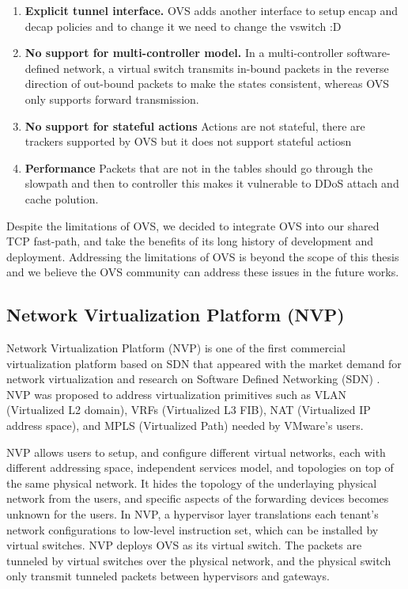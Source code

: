 \begin{enumerate}
    \item \textbf{Explicit tunnel interface.} OVS adds another interface to setup encap and 
    decap policies and to change it we need to change the vswitch :D %

    \item \textbf{No support for multi-controller model.} In a multi-controller 
    software-defined network, a virtual switch transmits in-bound packets in the reverse 
    direction of out-bound packets to make the states consistent, whereas OVS only supports forward transmission. 

    \item \textbf{No support for stateful actions} Actions are not stateful, there are 
    trackers supported by OVS but it does not support stateful actiosn %

    \item \textbf{Performance} Packets that are not in the tables should go through the 
    slowpath and then to controller this makes it vulnerable to DDoS attach and cache 
    polution.  %

\end{enumerate}

Despite the limitations of OVS, we decided to integrate OVS into our shared TCP fast-path,
and take the benefits of its long history of development and deployment. Addressing 
the limitations of OVS is beyond the scope of this thesis and we believe the OVS community can
address these issues in the future works. 

\subsection{Network Virtualization Platform (NVP)}
\label{nvp}
Network Virtualization Platform (NVP) is one of the first commercial virtualization 
platform based on SDN that appeared with the market demand for network virtualization
and research on Software Defined Networking (SDN) \cite{koponen2014network}. NVP was proposed 
to address virtualization primitives such as VLAN (Virtualized L2 domain), 
VRFs (Virtualized L3 FIB), NAT 
(Virtualized IP address space), and MPLS (Virtualized Path) needed by VMware's users.

NVP allows users to setup, and configure different virtual networks, each with
different addressing space, independent services model, and topologies
on top of the same physical network. It hides the topology of  the underlaying physical network
from the users, and specific aspects of the forwarding devices becomes unknown for the users. 
In NVP, a hypervisor layer translations each tenant's network configurations to 
low-level instruction set, which can be installed by virtual switches. NVP deploys OVS
as its virtual switch. The packets are tunneled by virtual switches over the physical network, and 
the physical switch only transmit tunneled packets between hypervisors and gateways.

